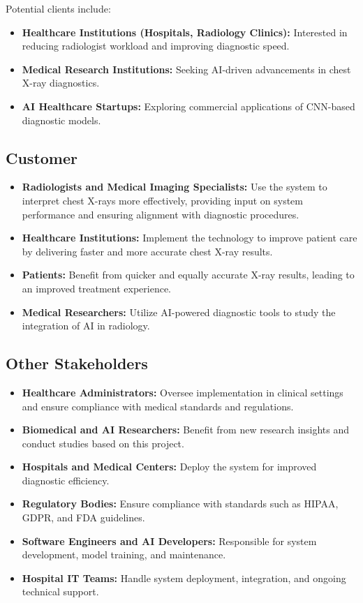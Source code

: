 \documentclass[12pt]{article}
\begin{document}
Potential clients include:
\begin{itemize}
    \item \textbf{Healthcare Institutions (Hospitals, Radiology Clinics):} Interested in reducing radiologist workload and improving diagnostic speed.
    \item \textbf{Medical Research Institutions:} Seeking AI-driven advancements in chest X-ray diagnostics.
    \item \textbf{AI Healthcare Startups:} Exploring commercial applications of CNN-based diagnostic models.
\end{itemize}

\subsection{Customer}
\begin{itemize}
    \item \textbf{Radiologists and Medical Imaging Specialists:} Use the system to interpret chest X-rays more effectively, providing input on system performance and ensuring alignment with diagnostic procedures.
    \item \textbf{Healthcare Institutions:} Implement the technology to improve patient care by delivering faster and more accurate chest X-ray results.
    \item \textbf{Patients:} Benefit from quicker and equally accurate X-ray results, leading to an improved treatment experience.
    \item \textbf{Medical Researchers:} Utilize AI-powered diagnostic tools to study the integration of AI in radiology.
\end{itemize}

\subsection{Other Stakeholders}
\begin{itemize}
    \item \textbf{Healthcare Administrators:} Oversee implementation in clinical settings and ensure compliance with medical standards and regulations.
    \item \textbf{Biomedical and AI Researchers:} Benefit from new research insights and conduct studies based on this project.
    \item \textbf{Hospitals and Medical Centers:} Deploy the system for improved diagnostic efficiency.
    \item \textbf{Regulatory Bodies:} Ensure compliance with standards such as HIPAA\cite{hipaa}, GDPR, and FDA guidelines.
    \item \textbf{Software Engineers and AI Developers:} Responsible for system development, model training, and maintenance.
    \item \textbf{Hospital IT Teams:} Handle system deployment, integration, and ongoing technical support.
\end{itemize}
\end{document}
